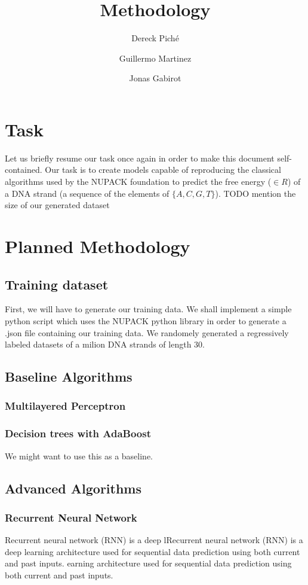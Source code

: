\documentclass{article}
\title{Methodology}
\author
{
    Dereck Piché \and
    Guillermo Martinez \and
    Jonas Gabirot \and
}
\begin{document}
\maketitle

\section{Task}
Let us briefly resume our task once again in order to make this document
self-contained. Our task is to create models capable of reproducing 
the classical algorithms used by the NUPACK foundation to predict the 
free energy ($\in R$) of a DNA strand (a sequence of the elements of $\{A,C,G,T\}$).
TODO mention the size of our generated dataset

\section{Planned Methodology}
\subsection{Training dataset}
First, we will have to generate our training data. We shall implement a 
simple python script which uses the NUPACK python library in order
to generate a .json file containing our training data. We randomely 
generated a regressively labeled datasets of a milion DNA strands of length $30$.
\subsection{Baseline Algorithms}

\subsubsection{Multilayered Perceptron}

\subsubsection{Decision trees with AdaBoost}
We might want to use this as a baseline. 


\subsection{Advanced Algorithms}

\subsubsection{Recurrent Neural Network}
Recurrent neural network (RNN) is a deep lRecurrent neural network 
(RNN) is a deep learning architecture used for sequential data prediction
using both current and past inputs. earning architecture used for sequential 
data prediction using both current and past inputs. 
\end{document}

